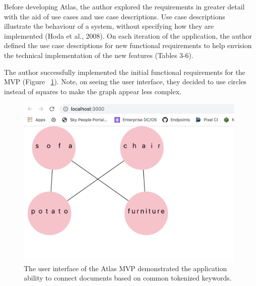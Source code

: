 \documentclass{article}
\begin{document}
\begin{table}[!t]
\centering
\caption{The functional requirements and use cases that defined the minimum viable product.}
\label{tab:my-table}
\end{table}

Before developing Atlas, the author explored the requirements in greater detail with the aid of use cases and use case descriptions. Use case descriptions illustrate the behaviour of a system, without specifying how they are implemented (Hoda et al., 2008). On each iteration of the application, the author defined the use case descriptions for new functional requirements to help envision the technical implementation of the new features (Tables 3-6).

The author successfully implemented the initial functional requirements for the MVP (Figure ~\ref{fig:mvp}). Note, on seeing the user interface, they decided to use circles instead of squares to make the graph appear less complex. 

\clearpage
\begin{figure}[t!]
  \centering
      \includegraphics[width=1\textwidth]{images/mvp-frontend.png}
  \caption{The user interface of the Atlas MVP demonstrated the application ability to connect documents based on common tokenized keywords.}
  \vspace*{4in}
  \label{fig:mvp}
\end{figure}
\end{document}

